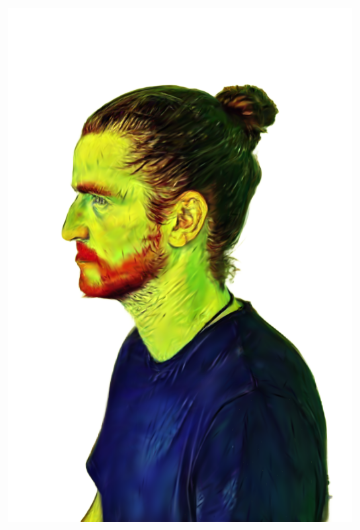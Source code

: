 \begin{figure}[ht]
\begin{subfigure}{0.2\linewidth}
		\includegraphics[width=\textwidth]{Figures/results/high/ephra_vangogh/24_render.png}

\end{subfigure}
\end{figure}
